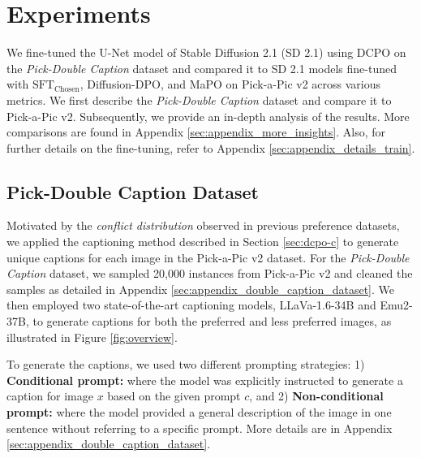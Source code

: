 \section{Experiments}
\label{sec:experimets}

We fine-tuned the U-Net model of Stable Diffusion 2.1 (SD 2.1) using DCPO on the \textit{Pick-Double Caption} dataset and compared it to SD 2.1 models fine-tuned with \( \text{SFT}_{\text{Chosen}} \), Diffusion-DPO, and MaPO on Pick-a-Pic v2 across various metrics. We first describe the \textit{Pick-Double Caption} dataset and compare it to Pick-a-Pic v2. Subsequently, we provide an in-depth analysis of the results. More comparisons are found in Appendix \ref{sec:appendix_more_insights}. Also, for further details on the fine-tuning, refer to Appendix \ref{sec:appendix_details_train}.

\subsection{Pick-Double Caption Dataset}
\label{sec:pick-double-caption}
    


Motivated by the \textit{conflict distribution} observed in previous preference datasets, we applied the captioning method described in Section \ref{sec:dcpo-c} to generate unique captions for each image in the Pick-a-Pic v2 dataset. For the \textit{Pick-Double Caption} dataset, we sampled 20,000 instances from Pick-a-Pic v2 and cleaned the samples as detailed in Appendix \ref{sec:appendix_double_caption_dataset}. We then employed two state-of-the-art captioning models, LLaVa-1.6-34B and Emu2-37B, to generate captions for both the preferred and less preferred images, as illustrated in Figure \ref{fig:overview}.


To generate the captions, we used two different prompting strategies: 1) \textbf{Conditional prompt:} where the model was explicitly instructed to generate a caption for image \( x \) based on the given prompt \( c \), and 2) \textbf{Non-conditional prompt:} where the model provided a general description of the image in one sentence without referring to a specific prompt. More details are in Appendix \ref{sec:appendix_double_caption_dataset}.



